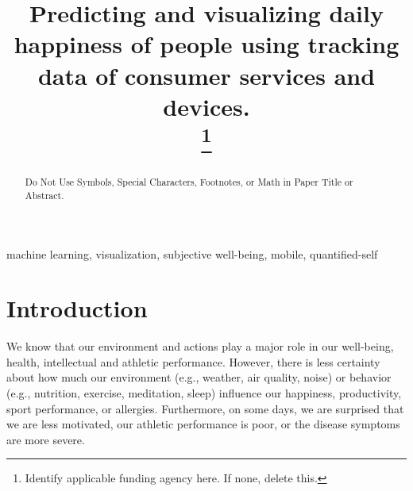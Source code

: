 \documentclass[conference]{IEEEtran}
\begin{document}
\title{Predicting and visualizing daily happiness of people using tracking data of consumer services and devices.\\
\thanks{Identify applicable funding agency here. If none, delete this.}
}

\author{


\and


\and


}

\maketitle

\begin{abstract}
Do Not Use Symbols, Special Characters, Footnotes, 
or Math in Paper Title or Abstract.
\end{abstract}

\begin{IEEEkeywords}
machine learning, visualization, subjective well-being, mobile, quantified-self
\end{IEEEkeywords}

\section{Introduction}
We know that our environment and actions play a major role in our well-being, health, intellectual and athletic performance.
However, there is less certainty about how much our environment (e.g., weather, air quality, noise) or behavior (e.g., nutrition, exercise, meditation, sleep) influence our happiness, productivity, sport performance, or allergies.
Furthermore, on some days, we are surprised that we are less motivated, our athletic performance is poor, or the disease symptoms are more severe.
\end{document}
